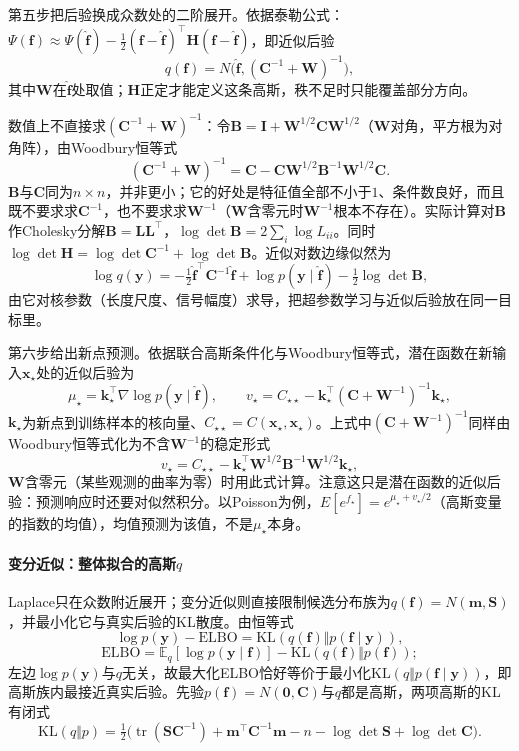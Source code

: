 第五步把后验换成众数处的二阶展开。依据泰勒公式：$\Psi(\bm f)\approx\Psi(\widehat{\bm f})-\tfrac12(\bm f-\widehat{\bm f})^{\top}\bm H(\bm f-\widehat{\bm f})$，即近似后验
\[
  q(\bm f)=N\big(\widehat{\bm f},(\bm C^{-1}+\bm W)^{-1}\big),
\]
其中$\bm W$在$\widehat{\bm f}$处取值；$\bm H$正定才能定义这条高斯，秩不足时只能覆盖部分方向。

数值上不直接求$(\bm C^{-1}+\bm W)^{-1}$：令$\bm B=\bm I+\bm W^{1/2}\bm C\bm W^{1/2}$（$\bm W$对角，平方根为对角阵），由Woodbury恒等式
\[
  (\bm C^{-1}+\bm W)^{-1}=\bm C-\bm C\bm W^{1/2}\bm B^{-1}\bm W^{1/2}\bm C.
\]
$\bm B$与$\bm C$同为$n\times n$，并非更小；它的好处是特征值全部不小于$1$、条件数良好，而且既不要求求$\bm C^{-1}$，也不要求求$\bm W^{-1}$（$\bm W$含零元时$\bm W^{-1}$根本不存在）。实际计算对$\bm B$作Cholesky分解$\bm B=\bm L\bm L^{\top}$，$\log\det\bm B=2\sum_i\log L_{ii}$。同时$\log\det\bm H=\log\det\bm C^{-1}+\log\det\bm B$。近似对数边缘似然为
\[
  \log q(\bm y)=-\tfrac12\widehat{\bm f}^{\top}\bm C^{-1}\widehat{\bm f}
  +\log p(\bm y\mid\widehat{\bm f})-\tfrac12\log\det\bm B,
\]
由它对核参数（长度尺度、信号幅度）求导，把超参数学习与近似后验放在同一目标里。

第六步给出新点预测。依据联合高斯条件化与Woodbury恒等式，潜在函数在新输入$\bm x_\star$处的近似后验为
\[
  \mu_\star=\bm k_\star^{\top}\nabla\log p(\bm y\mid\widehat{\bm f}),
  \qquad
  v_\star=C_{\star\star}-\bm k_\star^{\top}(\bm C+\bm W^{-1})^{-1}\bm k_\star,
\]
$\bm k_\star$为新点到训练样本的核向量、$C_{\star\star}=C(\bm x_\star,\bm x_\star)$。上式中$(\bm C+\bm W^{-1})^{-1}$同样由Woodbury恒等式化为不含$\bm W^{-1}$的稳定形式
\[
  v_\star=C_{\star\star}-\bm k_\star^{\top}\bm W^{1/2}\bm B^{-1}\bm W^{1/2}\bm k_\star,
\]
$\bm W$含零元（某些观测的曲率为零）时用此式计算。注意这只是潜在函数的近似后验：预测响应时还要对似然积分。以Poisson为例，$E[e^{f_\star}]=e^{\mu_\star+v_\star/2}$（高斯变量的指数的均值），均值预测为该值，不是$\mu_\star$本身。

\paragraph{变分近似：整体拟合的高斯$q$}

Laplace只在众数附近展开；变分近似则直接限制候选分布族为$q(\bm f)=N(\bm m,\bm S)$，并最小化它与真实后验的KL散度。由恒等式
\[
  \log p(\bm y)-\mathrm{ELBO}=\mathrm{KL}(q(\bm f)\Vert p(\bm f\mid\bm y)),
\]
\[
  \mathrm{ELBO}=\mathbb E_q[\log p(\bm y\mid\bm f)]-\mathrm{KL}(q(\bm f)\Vert p(\bm f));
\]
左边$\log p(\bm y)$与$q$无关，故最大化ELBO恰好等价于最小化$\mathrm{KL}(q\Vert p(\bm f\mid\bm y))$，即高斯族内最接近真实后验。先验$p(\bm f)=N(\bm 0,\bm C)$与$q$都是高斯，两项高斯的KL有闭式
\[
  \mathrm{KL}(q\Vert p)=\tfrac12\big(\operatorname{tr}(\bm S\bm C^{-1})+\bm m^{\top}\bm C^{-1}\bm m-n-\log\det\bm S+\log\det\bm C\big).
\]

